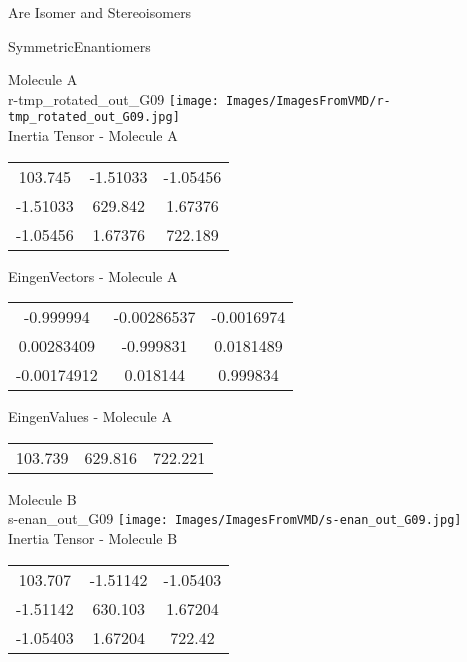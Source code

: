 \begin{center}
\vtab
\vtab
\textcolor{NavyBlue}{\Large Are Isomer and Stereoisomers}
\end{center}
\newpage

\vtab[-2cm]
\begin{center}
{\large SymmetricEnantiomers}
\end{center}
\begin{multicols}{2}
\begin{center}
Molecule A \\ 
r-tmp\_rotated\_out\_G09
\texttt{[image: Images/ImagesFromVMD/r-tmp\_rotated\_out\_G09.jpg]}
\\
Inertia Tensor - Molecule A \\
\vtab
\begin{tabular}{|c c c|}
103.745	 & 	-1.51033	 & 	-1.05456	 \\
-1.51033	 & 	629.842	 & 	1.67376	 \\
-1.05456	 & 	1.67376	 & 	722.189
\end{tabular}

\vtab
 EingenVectors - Molecule A     \\
\vtab
\begin{tabular}{|c c c|}
-0.999994	 & 	-0.00286537	 & 	-0.0016974	 \\
0.00283409	 & 	-0.999831	 & 	0.0181489	 \\
-0.00174912	 & 	0.018144	 & 	0.999834
\end{tabular}

\vtab
 EingenValues - Molecule A     \\
\vtab
\begin{tabular}{|c c c|}
103.739	 & 	629.816	 & 	722.221
\end{tabular}
\columnbreak

Molecule B \\ 
s-enan\_out\_G09
\texttt{[image: Images/ImagesFromVMD/s-enan\_out\_G09.jpg]}
\\
Inertia Tensor - Molecule B \\
\vtab
\begin{tabular}{|c c c|}
103.707	 & 	-1.51142	 & 	-1.05403	 \\
-1.51142	 & 	630.103	 & 	1.67204	 \\
-1.05403	 & 	1.67204	 & 	722.42
\end{tabular}


\end{center}
\end{multicols}
